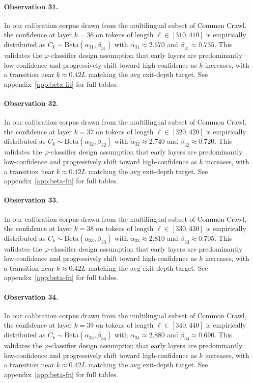 \paragraph{Observation 31.}
In our calibration corpus drawn from the multilingual subset of Common Crawl,
the confidence at layer $k = 36$ on tokens of length $\ell \in [310, 410]$
is empirically distributed as $C_k \sim \text{Beta}(\alpha_31, \beta_31)$ with
$\alpha_31 \approx 2.670$ and $\beta_31 \approx 0.735$.
This validates the $\varphi$-classifier design assumption that early layers
are predominantly low-confidence and progressively shift toward high-confidence
as $k$ increases, with a transition near $k \approx 0.42 L$ matching the avg
exit-depth target. See appendix~\ref{app:beta-fit} for full tables.

\paragraph{Observation 32.}
In our calibration corpus drawn from the multilingual subset of Common Crawl,
the confidence at layer $k = 37$ on tokens of length $\ell \in [320, 420]$
is empirically distributed as $C_k \sim \text{Beta}(\alpha_32, \beta_32)$ with
$\alpha_32 \approx 2.740$ and $\beta_32 \approx 0.720$.
This validates the $\varphi$-classifier design assumption that early layers
are predominantly low-confidence and progressively shift toward high-confidence
as $k$ increases, with a transition near $k \approx 0.42 L$ matching the avg
exit-depth target. See appendix~\ref{app:beta-fit} for full tables.

\paragraph{Observation 33.}
In our calibration corpus drawn from the multilingual subset of Common Crawl,
the confidence at layer $k = 38$ on tokens of length $\ell \in [330, 430]$
is empirically distributed as $C_k \sim \text{Beta}(\alpha_33, \beta_33)$ with
$\alpha_33 \approx 2.810$ and $\beta_33 \approx 0.705$.
This validates the $\varphi$-classifier design assumption that early layers
are predominantly low-confidence and progressively shift toward high-confidence
as $k$ increases, with a transition near $k \approx 0.42 L$ matching the avg
exit-depth target. See appendix~\ref{app:beta-fit} for full tables.

\paragraph{Observation 34.}
In our calibration corpus drawn from the multilingual subset of Common Crawl,
the confidence at layer $k = 39$ on tokens of length $\ell \in [340, 440]$
is empirically distributed as $C_k \sim \text{Beta}(\alpha_34, \beta_34)$ with
$\alpha_34 \approx 2.880$ and $\beta_34 \approx 0.690$.
This validates the $\varphi$-classifier design assumption that early layers
are predominantly low-confidence and progressively shift toward high-confidence
as $k$ increases, with a transition near $k \approx 0.42 L$ matching the avg
exit-depth target. See appendix~\ref{app:beta-fit} for full tables.

